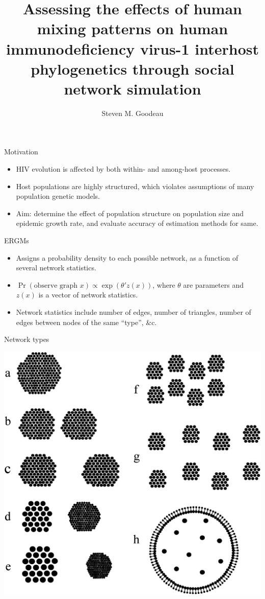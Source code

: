 \documentclass{beamer}
\title{Assessing the effects of human mixing patterns on human immunodeficiency
  virus-1 interhost phylogenetics through social network simulation}
\author[Goodreau]{Steven M. Goodeau}
\begin{document}

\maketitle
\begin{frame}{Motivation}
  \begin{itemize}
    \setlength{\itemsep}{12pt}
    \item HIV evolution is affected by both within- and among-host processes.
    \item Host populations are highly structured, which violates assumptions of 
      many population genetic models.
    \item Aim: determine the effect of population structure on population
      size and epidemic growth rate, and evaluate accuracy of estimation
      methods for same.
  \end{itemize}
\end{frame}

\begin{frame}{ERGMs}
  \begin{itemize}
    \setlength{\itemsep}{12pt}
    \item Assigns a probability density to each possible network, as a function
      of several network statistics.
    \item $\Pr(\text{observe graph } x) \propto \exp(\theta' z(x))$, where
      $\theta$ are parameters and $z(x)$ is a vector of network statistics.
    \item Network statistics include number of edges, number of triangles,
      number of edges between nodes of the same ``type'', \&c.
  \end{itemize}
\end{frame}

\begin{frame}{Network types}
  \centerline{\includegraphics[height=0.8\textheight]{F1}}
\end{frame}
\end{document}
